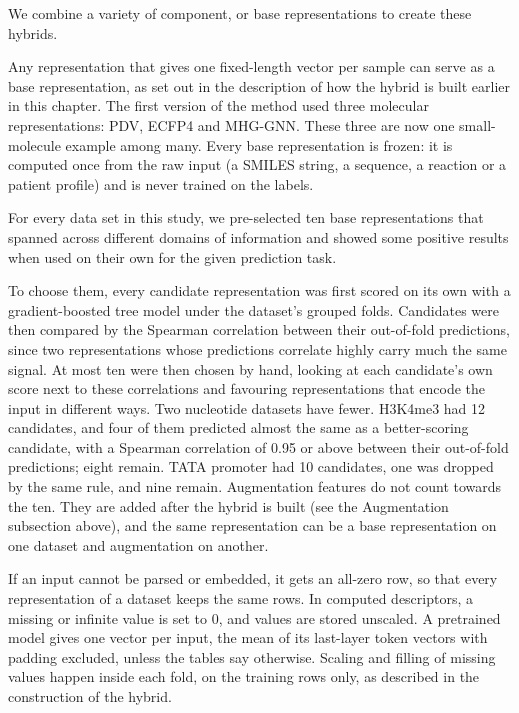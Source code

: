 We combine a variety of component, or base representations to create these hybrids.

Any representation that gives one fixed-length vector per sample can serve as a base representation, as set out in the description of how the hybrid is built earlier in this chapter. The first version of the method used three molecular representations: PDV, ECFP4 and MHG-GNN. These three are now one small-molecule example among many. Every base representation is frozen: it is computed once from the raw input (a SMILES string, a sequence, a reaction or a patient profile) and is never trained on the labels.

For every data set in this study, we pre-selected ten base representations that spanned across different domains of information and showed some positive results when used on their own for the given prediction task.

To choose them, every candidate representation was first scored on its own with a gradient-boosted tree model \citep{ke2017lightgbm} under the dataset's grouped folds. Candidates were then compared by the Spearman correlation between their out-of-fold predictions, since two representations whose predictions correlate highly carry much the same signal. At most ten were then chosen by hand, looking at each candidate's own score next to these correlations and favouring representations that encode the input in different ways. Two nucleotide datasets have fewer. H3K4me3 had 12 candidates, and four of them predicted almost the same as a better-scoring candidate, with a Spearman correlation of 0.95 or above between their out-of-fold predictions; eight remain. TATA promoter had 10 candidates, one was dropped by the same rule, and nine remain. Augmentation features do not count towards the ten. They are added after the hybrid is built (see the Augmentation subsection above), and the same representation can be a base representation on one dataset and augmentation on another.

If an input cannot be parsed or embedded, it gets an all-zero row, so that every representation of a dataset keeps the same rows. In computed descriptors, a missing or infinite value is set to 0, and values are stored unscaled. A pretrained model gives one vector per input, the mean of its last-layer token vectors with padding excluded, unless the tables say otherwise. Scaling and filling of missing values happen inside each fold, on the training rows only, as described in the construction of the hybrid.

